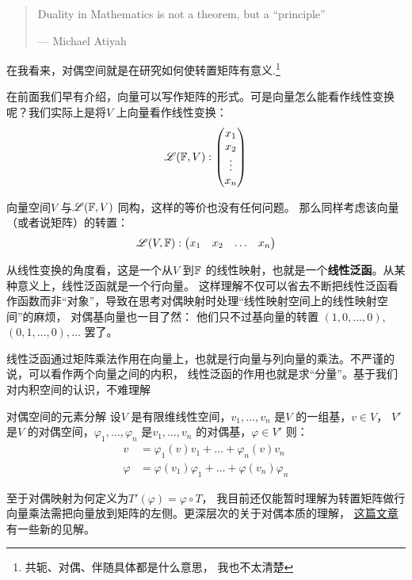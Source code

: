 \begin{quote}
    Duality in Mathematics is not a theorem, but a ``principle''

    \hfill --- Michael Atiyah
\end{quote}

在我看来，对偶空间就是在研究如何使转置矩阵有意义.\footnote{共轭、对偶、伴随具体都是什么意思，
我也不太清楚}

在前面我们早有介绍，向量可以写作矩阵的形式。可是向量怎么能看作线性变换呢？我们实际上是将\(V\)
上向量看作线性变换：\[
    \mathscr{L}(\mathbb{F},V):
    \begin{pmatrix}
        x_1 \\
        x_2 \\
        \vdots \\
        x_n
    \end{pmatrix}
\]

向量空间\(V\) 与\(\mathscr{L}(\mathbb{F},V)\) 同构，这样的等价也没有任何问题。
那么同样考虑该向量（或者说矩阵）的转置：
\[
    \mathscr{L}(V,\mathbb{F}):
    \begin{pmatrix}
        x_1 & x_2 & \dots & x_n
    \end{pmatrix}
\]

从线性变换的角度看，这是一个从\(V\) 到\(\mathbb{F}\)
的线性映射，也就是一个\textbf{线性泛函}。从某种意义上，线性泛函就是一个行向量。
这样理解不仅可以省去不断把线性泛函看作函数而非``对象''，导致在思考对偶映射时处理``线性映射空间上的线性映射空间''的麻烦，
对偶基向量也一目了然：
他们只不过基向量的转置 \((1,0,\dots ,0)\),\((0,1,\dots ,0),\dots \) 罢了。

线性泛函通过矩阵乘法作用在向量上，也就是行向量与列向量的乘法。不严谨的说，可以看作两个向量之间的内积，
线性泛函的作用也就是求``分量''。基于我们对内积空间的认识，不难理解
\begin{theorem}{对偶空间的元素分解}
    设\(V\) 是有限维线性空间，\(v_{1}, \dots ,v_{n}\) 是\(V\) 的一组基，\(v \in V\)，
    \(V'\) 是\(V\) 的对偶空间，\(\varphi_{1}, \dots ,\varphi_{n}\)
    是\(v_{1}, \dots ,v_{n}\) 的对偶基，\(\varphi \in V'\)
    则：
    \begin{align*}
        v &= \varphi_{1}(v)v_{1} + \dots + \varphi_{n}(v)v_{n} \\
        \varphi &= \varphi(v_{1})\varphi_{1} + \dots +
        \varphi(v_{n})\varphi_{n}
    \end{align*}
\end{theorem}

至于对偶映射为何定义为\(T'(\varphi)=\varphi \circ T\)，
我目前还仅能暂时理解为转置矩阵做行向量乘法需把向量放到矩阵的左侧。更深层次的关于对偶本质的理解，
\href{https://www.zhihu.com/question/38464481/answer/2110009942}{这篇文章}
有一些新的见解。
